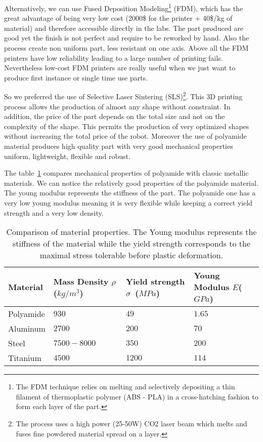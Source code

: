 Alternatively, we can use Fused Deposition Modeling\footnote{The FDM technique relies on melting and selectively depositing a thin filament of thermoplastic polymer (ABS - PLA) in a cross-hatching fashion to form each layer of the part.} (FDM), which has the great advantage of being very low cost (2000\$ for the printer + 40\$/kg of material) and therefore accessible directly in the labs. The part produced are good yet the finish is not perfect and require to be reworked by hand. Also the process create non uniform part, less resistant on one axis. Above all the FDM printers have low reliability leading to a large number of printing fails. Nevertheless low-cost FDM printers are really useful when we just want to produce first instance or single time use parts.

So we preferred the use of Selective Laser Sintering (SLS)\footnote{The process uses a high power (25-50W) CO2 laser beam which melts and fuses fine powdered material spread on a layer.}. This 3D printing process allows the production of almost any shape without constraint. In addition, the price of the part depends on the total size and not on the complexity of the shape. This permits the production of very optimized shapes without increasing the total price of the robot. Moreover the use of polyamide material produces high quality part with very good mechanical properties uniform, lightweight, flexible and robust.

The table~\ref{tab:materials} compares mechanical properties of polyamide with classic metallic materials. We can notice the relatively good properties of the polyamide material. The young modulus represents the stiffness of the part. The polyamide one has a very low young modulus meaning it is very flexible while keeping a correct yield strength and a very low density.

\begin{table}[h]
    \centering
    \begin{tabularx}{0.8\linewidth }{l X X X}
        Material & Mass Density $\rho$ ($kg/m^3$) &  Yield strength $\sigma$~($MPa$) & Young Modulus $E$($GPa$)\\
        \hline
        Polyamide & $930$ & $49$ & $1.65$\\

        Aluminum & $2700$ & $200$ & $70$\\

        Steel & $7500-8000$ & $350$ & $200$\\

        Titanium & $4500$ & $1200$ & $114$\\

    \end{tabularx}

    \caption{Comparison of material properties.
    The Young modulus represents the stiffness of the material while the yield strength corresponds to the maximal stress tolerable before plastic deformation.}
    \label{tab:materials}
\end{table}

